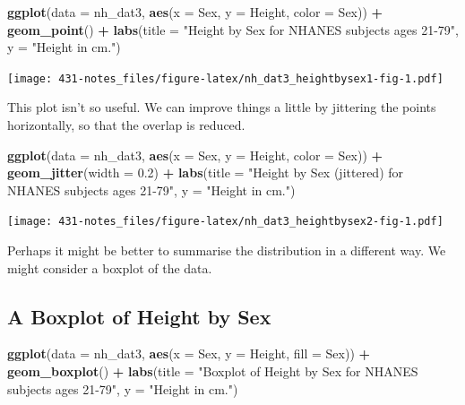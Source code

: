 \documentclass[
]{book}
\newenvironment{Shaded}{\begin{snugshade}}{\end{snugshade}}
\newcommand{\DataTypeTok}[1]{\textcolor[rgb]{0.13,0.29,0.53}{#1}}
\newcommand{\FloatTok}[1]{\textcolor[rgb]{0.00,0.00,0.81}{#1}}
\newcommand{\KeywordTok}[1]{\textcolor[rgb]{0.13,0.29,0.53}{\textbf{#1}}}
\newcommand{\NormalTok}[1]{#1}
\newcommand{\OperatorTok}[1]{\textcolor[rgb]{0.81,0.36,0.00}{\textbf{#1}}}
\newcommand{\StringTok}[1]{\textcolor[rgb]{0.31,0.60,0.02}{#1}}
\begin{document}
\begin{Shaded}
\begin{Highlighting}[]
\KeywordTok{ggplot}\NormalTok{(}\DataTypeTok{data =}\NormalTok{ nh_dat3, }\KeywordTok{aes}\NormalTok{(}\DataTypeTok{x =}\NormalTok{ Sex, }\DataTypeTok{y =}\NormalTok{ Height, }\DataTypeTok{color =}\NormalTok{ Sex)) }\OperatorTok{+}\StringTok{ }
\StringTok{    }\KeywordTok{geom_point}\NormalTok{() }\OperatorTok{+}\StringTok{ }
\StringTok{    }\KeywordTok{labs}\NormalTok{(}\DataTypeTok{title =} \StringTok{"Height by Sex for NHANES subjects ages 21-79"}\NormalTok{,}
         \DataTypeTok{y =} \StringTok{"Height in cm."}\NormalTok{)}
\end{Highlighting}
\end{Shaded}

\texttt{[image: 431-notes\_files/figure-latex/nh\_dat3\_heightbysex1-fig-1.pdf]}

This plot isn't so useful. We can improve things a little by jittering the points horizontally, so that the overlap is reduced.

\begin{Shaded}
\begin{Highlighting}[]
\KeywordTok{ggplot}\NormalTok{(}\DataTypeTok{data =}\NormalTok{ nh_dat3, }\KeywordTok{aes}\NormalTok{(}\DataTypeTok{x =}\NormalTok{ Sex, }\DataTypeTok{y =}\NormalTok{ Height, }\DataTypeTok{color =}\NormalTok{ Sex)) }\OperatorTok{+}\StringTok{ }
\StringTok{    }\KeywordTok{geom_jitter}\NormalTok{(}\DataTypeTok{width =} \FloatTok{0.2}\NormalTok{) }\OperatorTok{+}\StringTok{ }
\StringTok{    }\KeywordTok{labs}\NormalTok{(}\DataTypeTok{title =} \StringTok{"Height by Sex (jittered) for NHANES subjects ages 21-79"}\NormalTok{,}
         \DataTypeTok{y =} \StringTok{"Height in cm."}\NormalTok{)}
\end{Highlighting}
\end{Shaded}

\texttt{[image: 431-notes\_files/figure-latex/nh\_dat3\_heightbysex2-fig-1.pdf]}

Perhaps it might be better to summarise the distribution in a different way. We might consider a boxplot of the data.

\hypertarget{a-boxplot-of-height-by-sex}{%
\subsection{A Boxplot of Height by Sex}\label{a-boxplot-of-height-by-sex}}

\begin{Shaded}
\begin{Highlighting}[]
\KeywordTok{ggplot}\NormalTok{(}\DataTypeTok{data =}\NormalTok{ nh_dat3, }\KeywordTok{aes}\NormalTok{(}\DataTypeTok{x =}\NormalTok{ Sex, }\DataTypeTok{y =}\NormalTok{ Height, }\DataTypeTok{fill =}\NormalTok{ Sex)) }\OperatorTok{+}\StringTok{ }
\StringTok{    }\KeywordTok{geom_boxplot}\NormalTok{() }\OperatorTok{+}\StringTok{ }
\StringTok{    }\KeywordTok{labs}\NormalTok{(}\DataTypeTok{title =} \StringTok{"Boxplot of Height by Sex for NHANES subjects ages 21-79"}\NormalTok{,}
         \DataTypeTok{y =} \StringTok{"Height in cm."}\NormalTok{)}
\end{Highlighting}
\end{Shaded}
\end{document}
